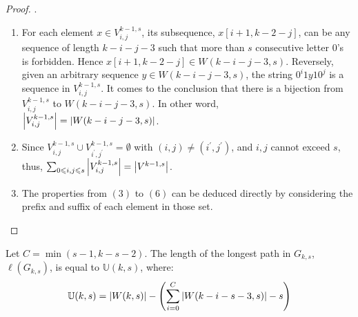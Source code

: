 \begin{proof}
    {\color{white}.}
    
    \begin{enumerate}
        \item For each element $x\in V^{k-1,s}_{i,j}$, its subsequence, $x[i+1,k-2-j]$, can be any sequence of length $k-i-j-3$ such that more than $s$ consecutive letter $0$'s is forbidden. Hence $x[i+1,k-2-j]\in W(k-i-j-3,s)$. Reversely, given an arbitrary sequence $y\in W(k-i-j-3,s)$, the string $0^{i}1y10^{j}$ is a sequence in $V^{k-1,s}_{i,j}$. It comes to the conclusion that there is a bijection from $V^{k-1,s}_{i,j}$ to $W(k-i-j-3,s)$. In other word, $\left \lvert  V^{k-1,s}_{i,j} \right \rvert = \left \lvert  W(k-i-j-3,s) \right \rvert $.
        
        \item Since $V^{k-1,s}_{i,j}\cup V^{k-1,s}_{i^{\prime},j^{\prime}} = \emptyset$ with $(i,j)\neq(i^{\prime},j^{\prime})$, and $i,j$ cannot exceed $s$, thus, $\sum_{0\leqslant i,j\leqslant s}\left \lvert  V^{k-1,s}_{i,j} \right \rvert = \left \lvert  V^{k-1,s} \right \rvert$.
        
        \item The properties from $(3)$ to $(6)$ can be deduced directly by considering the prefix and suffix of each element in those set.
    \end{enumerate}
\end{proof}



\begin{theorem}\label{theo:maximal_length}
    Let $C=\min{(s-1,k-s-2)}$. The length of the longest path in $G_{k,s}$, $\ell(G_{k,s})$, is equal to $\mathbb{U}(k,s)$, where:
    \begin{align}
        \mathbb{U}(k,s) = \left \lvert  W(k,s) \right \rvert - \left(\sum_{i=0}^{C}\left \lvert  W(k-i-s-3,s) \right \rvert - s\right)
    \end{align}
\end{theorem}

